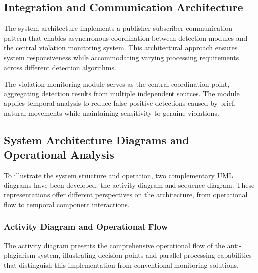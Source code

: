 \documentclass[conference]{IEEEtran}
\begin{document}
\subsection{Integration and Communication Architecture}

The system architecture implements a publisher-subscriber communication pattern that enables 
asynchronous coordination between detection modules and the central violation monitoring 
system. This architectural approach ensures system responsiveness while accommodating 
varying processing requirements across different detection algorithms.

The violation monitoring module serves as the central coordination point, aggregating 
detection results from multiple independent sources. The module applies temporal analysis 
to reduce false positive detections caused by brief, natural movements while maintaining 
sensitivity to genuine violations.

\subsection{System Architecture Diagrams and Operational Analysis}

To illustrate the system structure and operation, two complementary UML diagrams have been developed: the activity diagram and sequence diagram. These representations offer different perspectives on the architecture, from operational flow to temporal component interactions.

\subsubsection{Activity Diagram and Operational Flow}

The activity diagram presents the comprehensive operational flow of the anti-plagiarism system, illustrating decision points and parallel processing capabilities that distinguish this implementation from conventional monitoring solutions.
\end{document}
